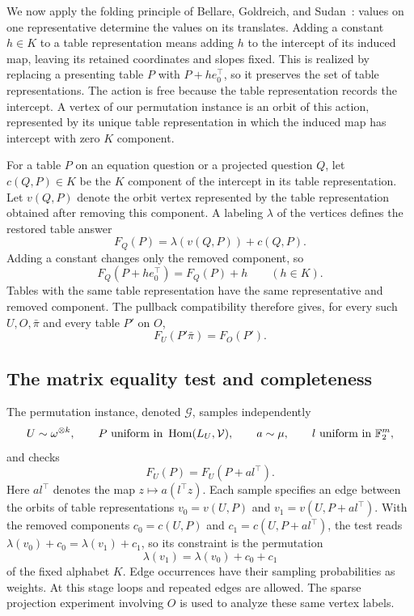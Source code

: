 We now apply the folding principle of Bellare, Goldreich, and
Sudan~\cite[Section~3.3]{BGS98}: values on one representative determine
the values on its translates.  Adding a constant \(h\in K\) to a table representation
means adding \(h\) to the intercept of its induced map, leaving its retained coordinates and
slopes fixed.  This is realized by replacing a presenting table \(P\)
with \(P+h e_0^\top\), so it preserves the set of table representations.  The action
is free because the table representation records the intercept.  A vertex of our
permutation instance is an orbit of this action, represented by its unique
table representation in which the induced map has intercept with zero \(K\) component.

For a table \(P\) on an equation question or a projected question
\(Q\), let \(c(Q,P)\in K\) be the \(K\) component of
the intercept in its table representation.  Let \(v(Q,P)\) denote the orbit vertex
represented by the table representation obtained after removing this component.
A labeling \(\lambda\) of the vertices defines the restored table answer
\[
 F_Q(P)=\lambda(v(Q,P))+c(Q,P).
\]
Adding a constant changes only the removed component, so
\begin{equation}
 F_Q(P+h e_0^\top)=F_Q(P)+h
 \qquad(h\in K).
 \label{eq:table-folding}
\end{equation}
Tables with the same table representation have the same representative and removed
component.  The pullback compatibility therefore gives, for every
such \(U,O,\bar\pi\) and every table \(P'\) on \(O\),
\begin{equation}
 F_U(P'\bar\pi)=F_O(P').
 \label{eq:table-sharing}
\end{equation}

\subsection{The matrix equality test and completeness}

The permutation instance, denoted \(\mathcal G\), samples independently
\[
 U\sim\omega^{\otimes k},\qquad
 P\text{ uniform in }\operatorname{Hom}(L_U,\mathcal V),\qquad
 a\sim\mu,\qquad l\text{ uniform in }\mathbb F_2^m,
\]
and checks
\begin{equation}
 F_U(P)=F_U(P+a l^\top).
 \label{eq:matrix-test}
\end{equation}
Here \(a l^\top\) denotes the map \(z\mapsto a(l^\top z)\).
Each sample specifies an edge between the orbits of table representations
\(v_0=v(U,P)\) and \(v_1=v(U,P+a l^\top)\).  With the removed components
\(c_0=c(U,P)\) and \(c_1=c(U,P+a l^\top)\), the test reads
\(\lambda(v_0)+c_0=\lambda(v_1)+c_1\), so its constraint is the
permutation
\[
 \lambda(v_1)=\lambda(v_0)+c_0+c_1
\]
of the fixed alphabet \(K\).  Edge occurrences have their sampling
probabilities as weights.  At this stage loops and repeated edges are
allowed.  The sparse projection experiment involving \(O\) is used to
analyze these same vertex labels.

